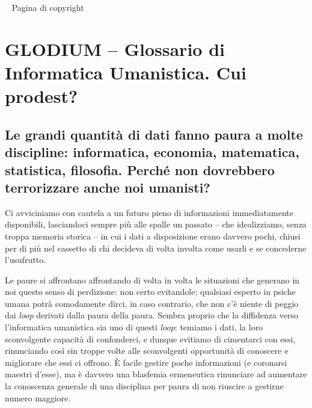 \documentclass[
  b5paper,
  twoside,
  12pt,
  chapterprefix=false,
  bibliography=totocnumbered,
  parskip=false]{scrbook}
\begin{document}
\thispagestyle{empty}

~\cleardoublepage
\thispagestyle{empty}
\vspace{\fill}
Pagina di copyright




{
\setcounter{tocdepth}{0}
\tableofcontents
}

\mainmatter
\hypertarget{glodium-glossario-di-informatica-umanistica.-cui-prodest}{%
\chapter*{GLODIUM -- Glossario di Informatica Umanistica. Cui prodest?}\label{glodium-glossario-di-informatica-umanistica.-cui-prodest}}


\hypertarget{le-grandi-quantita-di-dati-fanno-paura-a-molte-discipline-informatica-economia-matematica-statistica-filosofia.-perche-non-dovrebbero-terrorizzare-anche-noi-umanisti}{%
\section*{Le grandi quantità di dati fanno paura a molte discipline: informatica, economia, matematica, statistica, filosofia. Perché non dovrebbero terrorizzare anche noi umanisti?}\label{le-grandi-quantita-di-dati-fanno-paura-a-molte-discipline-informatica-economia-matematica-statistica-filosofia.-perche-non-dovrebbero-terrorizzare-anche-noi-umanisti}}

Ci avviciniamo con cautela a un futuro pieno di informazioni
immediatamente disponibili, lasciandoci sempre più alle spalle un
passato -- che idealizziamo, senza troppa memoria storica -- in cui i
dati a disposizione erano davvero pochi, chiusi per di più nel cassetto
di chi decideva di volta involta come usarli e se concederne
l'usufrutto.

Le paure si affrontano affrontando di volta in volta le situazioni che
generano in noi questo senso di perdizione: non certo evitandole;
qualsiasi esperto in psiche umana potrà comodamente dirci, in caso
contrario, che non c'è niente di peggio dai \emph{loop} derivati dalla paura
della paura. Sembra proprio che la diffidenza verso l'informatica
umanistica sia uno di questi \emph{loop}: temiamo i dati, la loro
sconvolgente capacità di confonderci, e dunque evitiamo di cimentarci
con essi, rinunciando così sin troppe volte alle sconvolgenti
opportunità di conoscere e migliorare che essi ci offrono. È facile
gestire poche informazioni (e coronarsi maestri d'esse), ma è davvero
una blasfemia ermeneutica rinunciare ad aumentare la conoscenza generale
di una disciplina per paura di non riuscire a gestirne numero maggiore.
\end{document}
